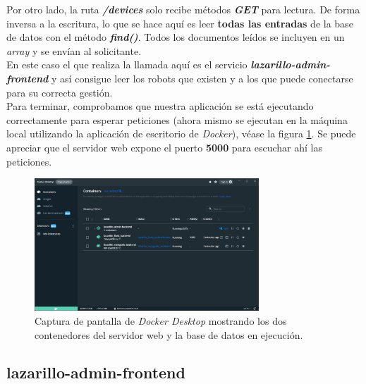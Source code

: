 Por otro lado, la ruta \textbf{\textit{/devices}} solo recibe métodos \textbf{\textit{GET}} para lectura. De forma inversa a la escritura, lo que se hace aquí es leer \textbf{todas las entradas} de la base de datos con el método \textbf{\textit{find()}}. Todos los documentos leídos se incluyen en un \textit{array} y se envían al solicitante.\\

En este caso el que realiza la llamada aquí es el servicio \textbf{\textit{lazarillo-admin-frontend}} y así consigue leer los robots que existen y a los que puede conectarse para su correcta gestión.\\

Para terminar, comprobamos que nuestra aplicación se está ejecutando correctamente para esperar peticiones (ahora mismo se ejecutan en la máquina local utilizando la aplicación de escritorio de \textit{Docker}), véase la figura \ref{docker-run}. Se puede apreciar que el servidor web expone el puerto \textbf{5000} para escuchar ahí las peticiones.\\

\begin{figure}[h]
	\centering
	\includegraphics[width=0.75\textwidth]{imagenes/docker-run.png}
	\caption{Captura de pantalla de \textit{Docker Desktop} mostrando los dos contenedores del servidor web y la base de datos en ejecución.}
	\label{docker-run}
\end{figure}


\subsection{lazarillo-admin-frontend}











